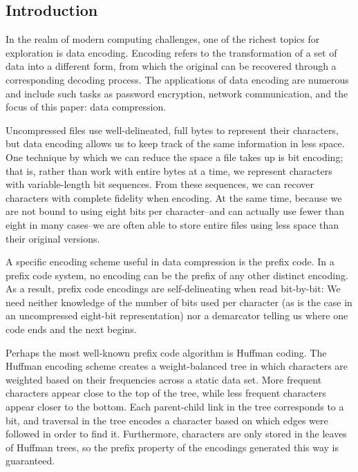\documentclass[twoside]{article}
\begin{document}
\begin{multicols}{2} %

\section{Introduction}

In the realm of modern computing challenges, one of the richest topics for exploration is data encoding. Encoding refers to the transformation of a set of data into a different form, from which the original can be recovered through a corresponding decoding process. The applications of data encoding are numerous and include such tasks as password encryption, network communication, and the focus of this paper: data compression.

Uncompressed files use well-delineated, full bytes to represent their characters, but data encoding allows us to keep track of the same information in less space. One technique by which we can reduce the space a file takes up is bit encoding; that is, rather than work with entire bytes at a time, we represent characters with variable-length bit sequences. From these sequences, we can recover characters with complete fidelity when encoding. At the same time, because we are not bound to using eight bits per character--and can actually use fewer than eight in many cases--we are often able to store entire files using less space than their original versions.

A specific encoding scheme useful in data compression is the prefix code. In a prefix code system, no encoding can be the prefix of any other distinct encoding. As a result, prefix code encodings are self-delineating when read bit-by-bit: We need neither knowledge of the number of bits used per character (as is the case in an uncompressed eight-bit representation) nor a demarcator telling us where one code ends and the next begins. 

Perhaps the most well-known prefix code algorithm is Huffman coding. The Huffman encoding scheme creates a weight-balanced tree in which characters are weighted based on their frequencies across a static data set. More frequent characters appear close to the top of the tree, while less frequent characters appear closer to the bottom. Each parent-child link in the tree corresponds to a bit, and traversal in the tree encodes a character based on which edges were followed in order to find it. Furthermore, characters are only stored in the leaves of Huffman trees, so the prefix property of the encodings generated this way is guaranteed.


\end{multicols}
\end{document}
